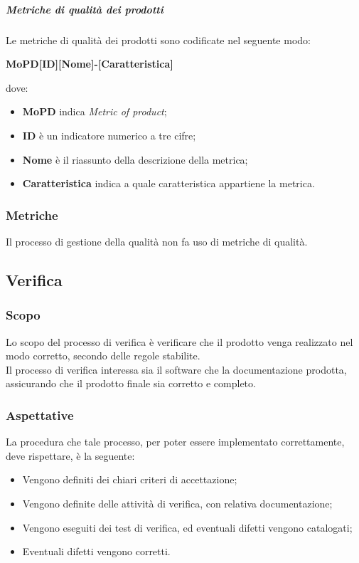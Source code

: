 \documentclass[../norme-di-progetto.tex]{subfiles}
\begin{document}
\subparagraph{Metriche di qualità dei prodotti}
Le metriche di qualità dei prodotti sono codificate nel seguente modo:
\begin{center}
  \centering
  \textbf{MoPD[ID][Nome]-[Caratteristica]}
\end{center} dove:
\begin{itemize}
  \item \textbf{MoPD} indica \textit{Metric of product};
  \item \textbf{ID} è un indicatore numerico a tre cifre;
  \item \textbf{Nome} è il riassunto della descrizione della metrica;
  \item \textbf{Caratteristica} indica a quale caratteristica appartiene la metrica.
\end{itemize}

\subsubsection{Metriche}
Il processo di gestione della qualità non fa uso di metriche di qualità.

\subsection{Verifica}

\subsubsection{Scopo}
Lo scopo del processo di verifica è verificare che il prodotto venga realizzato nel modo corretto, secondo delle regole stabilite. \\
Il processo di verifica interessa sia il software che la documentazione prodotta, assicurando che il prodotto finale sia corretto e completo.

\subsubsection{Aspettative}
La procedura che tale processo, per poter essere implementato correttamente, deve rispettare, è la seguente:
\begin{itemize}
  \item Vengono definiti dei chiari criteri di accettazione;
  \item Vengono definite delle attività di verifica, con relativa documentazione;
  \item Vengono eseguiti dei test di verifica, ed eventuali difetti vengono catalogati;
  \item Eventuali difetti vengono corretti.
\end{itemize}
\end{document}
